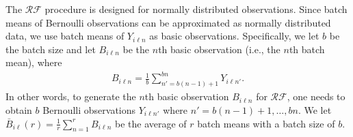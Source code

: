 \documentclass[11pt]{article}
\begin{document}
The $\mathcal{RF}$ procedure is designed for normally distributed observations. Since batch means of Bernoulli observations can be approximated as normally distributed data, 
we use batch means of $Y_{i\ell n}$ as basic observations. 
Specifically, we let $b$ be the batch size and let ${B}_{i\ell n}$ be the $n$th basic observation (i.e., the $n$th batch mean), where 
\begin{align}
    {B}_{i\ell n} = \frac{1}{b}\sum_{n'=b(n-1)+1}^{bn} Y_{i\ell {n'}}.  \label{eqn:BatchMeans_RF}
\end{align}
In other words, to generate the $n$th basic observation ${B}_{i\ell n}$ for $\mathcal{RF}$, one needs to obtain $b$ Bernoulli observations $Y_{i\ell n'}$ where $n'=b(n-1)+1, \ldots, bn$. We let $\bar{B}_{i\ell}{(r)}=\frac{1}{r} \sum_{n=1}^r B_{i\ell n}$ be the average of $r$ batch means with a batch size of $b$.
\end{document}
